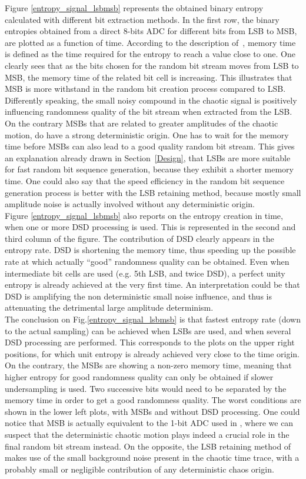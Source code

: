 Figure \ref{entropy_signal_lsbmsb} represents the obtained binary
entropy calculated with different bit extraction methods. In the first
row, the binary entropies obtained from a direct 8-bits ADC for
different bits from LSB to MSB, are plotted as a function of
time. According to the description of~\cite{PhysRevE.85.016211},
memory time is defined as the time required for the entropy to reach a
value close to one. One clearly sees that as the bits chosen for the
random bit stream moves from LSB to MSB, the memory time of the
related bit cell is increasing. This illustrates that MSB is more
withstand in the random bit creation process compared to
LSB. Differently speaking, the small noisy compound in the chaotic
signal is positively influencing randomness quality of the bit stream
when extracted from the LSB. On the contrary MSBs that are related to
greater amplitudes of the chaotic motion, do have a strong
deterministic origin. One has to wait for the memory time before MSBs
can also lead to a good quality random bit stream. This gives an
explanation already drawn in Section~\ref{Design}, that LSBs are more
suitable for fast random bit sequence generation, because they exhibit
a shorter memory time. One could also say that the speed efficiency in
the random bit sequence generation process is better with the LSB
retaining method, because mostly small amplitude noise is actually
involved without any deterministic origin.\\
Figure \ref{entropy_signal_lsbmsb} also reports on the entropy
creation in time, when one or more DSD processing is used. This is
represented in the second and third column of the figure. The
contribution of DSD clearly appears in the entropy rate. DSD is
shortening the memory time, thus speeding up the possible rate at
which actually ``good'' randomness quality can be obtained. Even when
intermediate bit cells are used (e.g. 5th LSB, and twice DSD), a
perfect unity entropy is already achieved at the very first time. An
interpretation could be that DSD is amplifying the non deterministic
small noise influence, and thus is attenuating the detrimental large
amplitude determinism.\\
The conclusion on Fig.\ref{entropy_signal_lsbmsb} is that fastest
entropy rate (down to the actual sampling) can be achieved when LSBs
are used, and when several DSD processing are performed. This
corresponds to the plots on the upper right positions, for which unit
entropy is already achieved very close to the time origin. On the
contrary, the MSBs are showing a non-zero memory time, meaning that
higher entropy for good randomness quality can only be obtained if
slower undersampling is used. Two successive bits would need to be
separated by the memory time in order to get a good randomness quality. The worst
conditions are shown in the lower left plots, with MSBs and without
DSD processing. One could notice that MSB is actually equivalent to
the 1-bit ADC used in \cite{fast}, where we can suspect that the
deterministic chaotic motion plays indeed a crucial role in the final
random bit stream instead. On the opposite, the LSB retaining method
of \cite{ultrafast2009} makes use of the small background noise
present in the chaotic time trace, with a probably small or negligible
contribution of any deterministic chaos origin.

